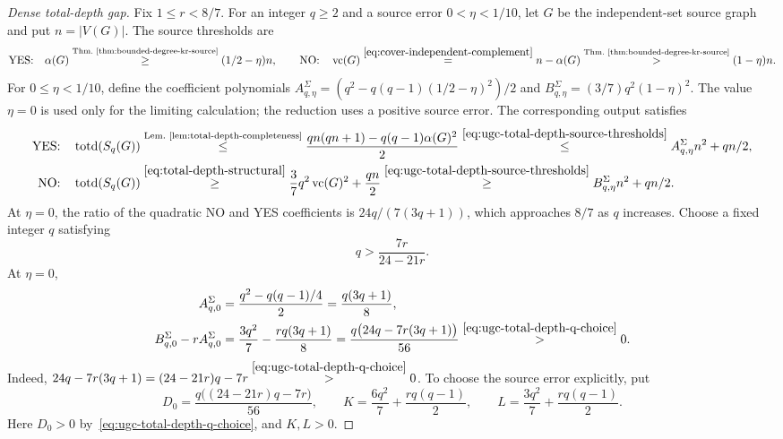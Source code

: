 \begin{proof}[Dense total-depth gap]
Fix $1\leq r<8/7$. For an integer $q\geq2$ and a source error
$0<\eta<1/10$, let $G$ be the independent-set source graph and
put $n=|V(G)|$. The source thresholds are
\begin{equation}\label{eq:ugc-total-depth-source-thresholds}
\textup{YES:}\quad \alpha(G)
 \overset{\text{Thm.~\ref{thm:bounded-degree-kr-source}}}{\geq}(1/2-\eta)n,
 \qquad \textup{NO:}\quad \operatorname{vc}(G)
 \overset{\eqref{eq:cover-independent-complement}}{=}n-\alpha(G)
 \overset{\text{Thm.~\ref{thm:bounded-degree-kr-source}}}{>}(1-\eta)n.
\end{equation}
For $0\leq\eta<1/10$, define the coefficient polynomials
$A^{\Sigma}_{q,\eta}=(q^2-q(q-1)(1/2-\eta)^2)/2$ and
$B^{\Sigma}_{q,\eta}=(3/7)q^2(1-\eta)^2$.
The value $\eta=0$ is used only for the limiting calculation;
the reduction uses a positive source error.
The corresponding output satisfies
\[
\begin{aligned}
 \textup{YES:}\quad \operatorname{totd}(S_q(G))
 &\overset{\text{Lem.~\ref{lem:total-depth-completeness}}}{\leq}
 \frac{qn(qn+1)-q(q-1)\alpha(G)^2}{2}
  \overset{\eqref{eq:ugc-total-depth-source-thresholds}}{\leq}
 A^{\Sigma}_{q,\eta}n^2+qn/2,\\
 \textup{NO:}\quad \operatorname{totd}(S_q(G))
 &\overset{\eqref{eq:total-depth-structural}}{\geq}
 \frac37q^2\operatorname{vc}(G)^2+\frac{qn}{2}
 \overset{\eqref{eq:ugc-total-depth-source-thresholds}}{\geq}
 B^{\Sigma}_{q,\eta}n^2+qn/2.
\end{aligned}
\]
At $\eta=0$, the ratio of the quadratic NO and YES coefficients
is $24q/(7(3q+1))$, which approaches $8/7$ as $q$ increases.
Choose a fixed integer $q$ satisfying
\begin{equation}\label{eq:ugc-total-depth-q-choice}
 q>\frac{7r}{24-21r}.
\end{equation}
At $\eta=0$,
\[
\begin{aligned}
 A^{\Sigma}_{q,0}
 &=\frac{q^2-q(q-1)/4}{2}=\frac{q(3q+1)}8,\\
 B^{\Sigma}_{q,0}-rA^{\Sigma}_{q,0}
 &=\frac{3q^2}{7}-\frac{rq(3q+1)}8
   =\frac{q\bigl(24q-7r(3q+1)\bigr)}{56}
   \overset{\eqref{eq:ugc-total-depth-q-choice}}{>}0.
\end{aligned}
\]
Indeed,
$24q-7r(3q+1)=(24-21r)q-7r
\overset{\eqref{eq:ugc-total-depth-q-choice}}{>}0$.
To choose the source error explicitly, put
\[
 D_0=\frac{q\bigl((24-21r)q-7r\bigr)}{56},\qquad
 K=\frac{6q^2}{7}+\frac{rq(q-1)}2,\qquad
 L=\frac{3q^2}{7}+\frac{rq(q-1)}2.
\]
Here $D_0>0$ by~\eqref{eq:ugc-total-depth-q-choice}, and $K,L>0$.

\end{proof}
